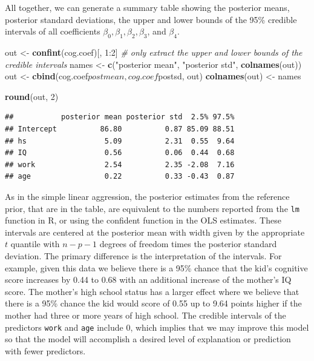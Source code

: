 \documentclass[]{book}
\newenvironment{Shaded}{\begin{snugshade}}{\end{snugshade}}
\newcommand{\KeywordTok}[1]{\textcolor[rgb]{0.13,0.29,0.53}{\textbf{{#1}}}}
\newcommand{\DecValTok}[1]{\textcolor[rgb]{0.00,0.00,0.81}{{#1}}}
\newcommand{\StringTok}[1]{\textcolor[rgb]{0.31,0.60,0.02}{{#1}}}
\newcommand{\CommentTok}[1]{\textcolor[rgb]{0.56,0.35,0.01}{\textit{{#1}}}}
\newcommand{\NormalTok}[1]{{#1}}
\theoremstyle{definition}
\theoremstyle{definition}
\theoremstyle{definition}
\theoremstyle{remark}
\begin{document}
All together, we can generate a summary table showing the posterior
means, posterior standard deviations, the upper and lower bounds of the
95\% credible intervals of all coefficients
\(\beta_0, \beta_1, \beta_2, \beta_3\), and \(\beta_4\).

\begin{Shaded}
\begin{Highlighting}[]
\NormalTok{out <-}\StringTok{ }\KeywordTok{confint}\NormalTok{(cog.coef)[, }\DecValTok{1}\NormalTok{:}\DecValTok{2}\NormalTok{]  }\CommentTok{# only extract the upper and lower bounds of the credible intervals}
\NormalTok{names <-}\StringTok{ }\KeywordTok{c}\NormalTok{(}\StringTok{"posterior mean"}\NormalTok{, }\StringTok{"posterior std"}\NormalTok{, }\KeywordTok{colnames}\NormalTok{(out))}
\NormalTok{out <-}\StringTok{ }\KeywordTok{cbind}\NormalTok{(cog.coef$postmean, cog.coef$postsd, out)}
\KeywordTok{colnames}\NormalTok{(out) <-}\StringTok{ }\NormalTok{names}

\KeywordTok{round}\NormalTok{(out, }\DecValTok{2}\NormalTok{)}
\end{Highlighting}
\end{Shaded}

\begin{verbatim}
##           posterior mean posterior std  2.5% 97.5%
## Intercept          86.80          0.87 85.09 88.51
## hs                  5.09          2.31  0.55  9.64
## IQ                  0.56          0.06  0.44  0.68
## work                2.54          2.35 -2.08  7.16
## age                 0.22          0.33 -0.43  0.87
\end{verbatim}

As in the simple linear aggression, the posterior estimates from the
reference prior, that are in the table, are equivalent to the numbers
reported from the \texttt{lm} function in R, or using the confident
function in the OLS estimates. These intervals are centered at the
posterior mean with width given by the appropriate \(t\) quantile with
\(n-p-1\) degrees of freedom times the posterior standard deviation. The
primary difference is the interpretation of the intervals. For example,
given this data we believe there is a 95\% chance that the kid's
cognitive score increases by 0.44 to 0.68 with an additional increase of
the mother's IQ score. The mother's high school status has a larger
effect where we believe that there is a 95\% chance the kid would score
of 0.55 up to 9.64 points higher if the mother had three or more years
of high school. The credible intervals of the predictors \texttt{work}
and \texttt{age} include 0, which implies that we may improve this model
so that the model will accomplish a desired level of explanation or
prediction with fewer predictors.
\end{document}
